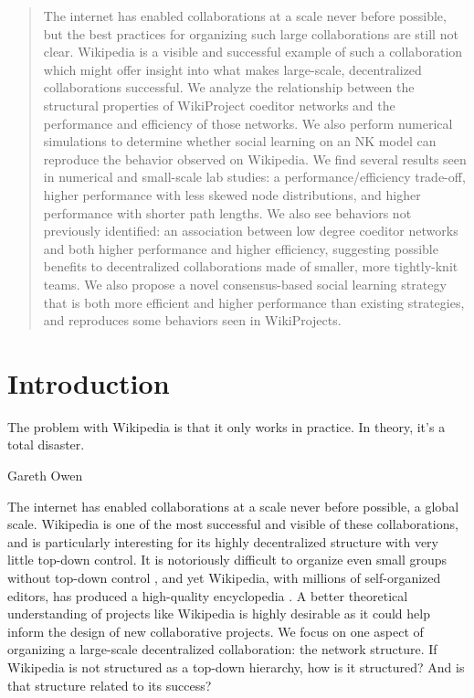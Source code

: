 \begin{abstract}
The internet has enabled collaborations at a scale never before possible,
but the best practices for organizing such large collaborations are still not clear.
Wikipedia is a visible and successful example of such a collaboration which might offer
insight into what makes large-scale, decentralized collaborations successful.
We analyze the relationship between the structural properties of WikiProject coeditor networks
and the performance and efficiency of those networks.
We also perform numerical simulations to determine whether social learning on an NK model can
reproduce the behavior observed on Wikipedia.
We find several results seen in numerical and small-scale lab studies:
a performance/efficiency trade-off,
higher performance with less skewed node distributions,
and higher performance with shorter path lengths.
We also see behaviors not previously identified: an association between low degree coeditor networks
and both higher performance and higher efficiency,
suggesting possible benefits to decentralized collaborations made of smaller, more tightly-knit teams.
We also propose a novel consensus-based social learning strategy that is both more efficient and higher
performance than existing strategies, and reproduces some behaviors seen in WikiProjects.
\end{abstract}

\maketitle

\section{Introduction}
\epigraph
{The problem with Wikipedia is that it only works in practice. In theory, it's a total disaster.}
{Gareth Owen \cite{elsharbaty_editing_2016} }

The internet has enabled collaborations at a scale never before possible, a global scale.
Wikipedia is one of the most successful and visible of these collaborations,
and is particularly interesting for its highly decentralized structure with very little top-down control.
It is notoriously difficult to organize even small groups without top-down control
\cite{freeman_tyranny_1972},
and yet Wikipedia, with millions of self-organized editors,
has produced a high-quality encyclopedia \cite{giles_internet_2005}.
A better theoretical understanding of projects like Wikipedia is highly desirable as it could
help inform the design of new collaborative projects.
We focus on one aspect of organizing a large-scale decentralized collaboration: the network structure.
If Wikipedia is not structured as a top-down hierarchy, how is it structured?
And is that structure related to its success?

